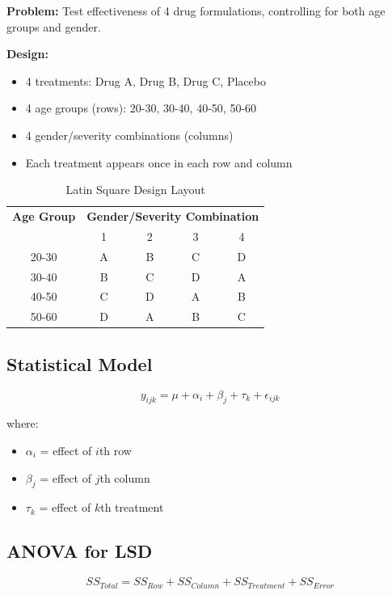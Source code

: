 \documentclass[twoside]{book}
\begin{document}
\textbf{Problem:} Test effectiveness of 4 drug formulations, controlling for both age groups and gender.

\textbf{Design:}
\begin{itemize}
    \item 4 treatments: Drug A, Drug B, Drug C, Placebo
    \item 4 age groups (rows): 20-30, 30-40, 40-50, 50-60
    \item 4 gender/severity combinations (columns)
    \item Each treatment appears once in each row and column
\end{itemize}

\begin{table}[h]
\centering
\caption{Latin Square Design Layout}
\begin{tabular}{|c|c|c|c|c|}
\hline
\textbf{Age Group} & \multicolumn{4}{c|}{\textbf{Gender/Severity Combination}} \\
\cline{2-5}
& 1 & 2 & 3 & 4 \\
\hline
20-30 & A & B & C & D \\
30-40 & B & C & D & A \\
40-50 & C & D & A & B \\
50-60 & D & A & B & C \\
\hline
\end{tabular}
\end{table}

\subsection{Statistical Model}

\begin{equation}
y_{ijk} = \mu + \alpha_i + \beta_j + \tau_k + \epsilon_{ijk}
\end{equation}

where:
\begin{itemize}
    \item $\alpha_i$ = effect of $i$th row
    \item $\beta_j$ = effect of $j$th column
    \item $\tau_k$ = effect of $k$th treatment
\end{itemize}

\subsection{ANOVA for LSD}

\begin{equation}
SS_{Total} = SS_{Row} + SS_{Column} + SS_{Treatment} + SS_{Error}
\end{equation}
\end{document}
